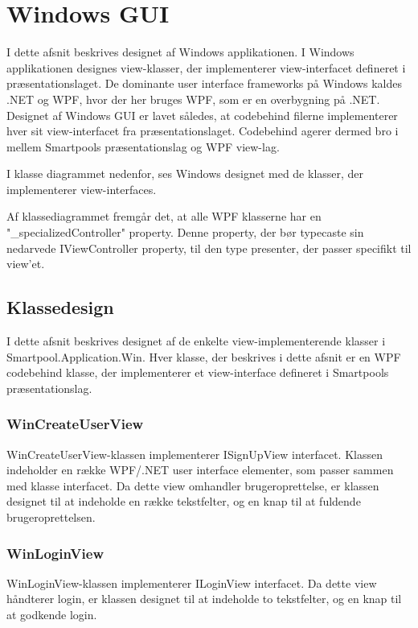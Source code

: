 \section{Windows GUI}
I dette afsnit beskrives designet af Windows applikationen. I Windows applikationen designes view-klasser, der implementerer view-interfacet defineret i præsentationslaget. De dominante user interface frameworks på Windows kaldes .NET og WPF, hvor der her bruges WPF, som er en overbygning på .NET. 
Designet af Windows GUI er lavet således, at codebehind filerne implementerer hver sit view-interfacet fra præsentationslaget.
Codebehind agerer dermed bro i mellem Smartpools præsentationslag og WPF view-lag.

I klasse diagrammet nedenfor, ses Windows designet med de klasser, der implementerer view-interfaces.


Af klassediagrammet fremgår det, at alle WPF klasserne har en "\_specializedController" property. Denne property, der bør typecaste sin nedarvede IViewController property, til den type presenter, der passer specifikt til view'et.

\subsection{Klassedesign}
I dette afsnit beskrives designet af de enkelte view-implementerende klasser i Smartpool.Application.Win. Hver klasse, der beskrives i dette afsnit er en WPF codebehind klasse, der implementerer et view-interface defineret i Smartpools præsentationslag.

\subsubsection{WinCreateUserView}
WinCreateUserView-klassen implementerer ISignUpView interfacet. Klassen indeholder en række WPF/.NET user interface elementer, som passer sammen med klasse interfacet. Da dette view omhandler brugeroprettelse, er klassen designet til at indeholde en række tekstfelter, og en knap til at fuldende brugeroprettelsen. 

\subsubsection{WinLoginView}
WinLoginView-klassen implementerer ILoginView interfacet. Da dette view håndterer login, er klassen designet til at indeholde to tekstfelter, og en knap til at godkende login.

